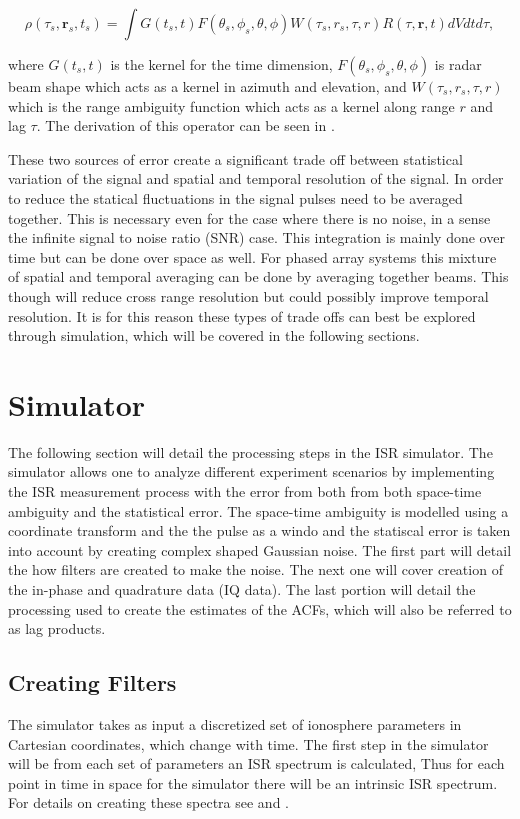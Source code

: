 \documentclass[draft,ras]{agutex}
\begin{document}
\begin{article}
\begin{equation}
\label{eqn:stafbrok}
\rho(\tau_s,\mathbf{r}_s,t_s)= \int G(t_s,t)F(\theta_s,\phi_s,\theta,\phi)W(\tau_s,r_s,\tau,r) R(\tau,\mathbf{r},t) dVdt d\tau,
\end{equation}

\noindent where $G(t_s,t)$ is the kernel for the time dimension, $F(\theta_s,\phi_s,\theta,\phi)$ is radar beam shape which acts as a kernel in azimuth and elevation, and $W(\tau_s,r_s,\tau,r) $ which is the range ambiguity function which acts as a kernel along range $r$ and lag $\tau$. The derivation of this operator can be seen in \citet{RDS:RDS20236}.

These two sources of error create a significant trade off between statistical variation of the signal and spatial and temporal resolution of the signal. In order to reduce the statical fluctuations in the signal pulses need to be averaged together. This is necessary even for the case where there is no noise, in a sense the infinite signal to noise ratio (SNR) case. This integration is mainly done over time but can be done over space as well. For phased array systems this mixture of spatial and temporal averaging can be done by averaging together beams. This though will reduce cross range resolution but could possibly improve temporal resolution. It is for this reason these types of trade offs can best be explored through simulation, which will be covered in the following sections.
\section{Simulator}

The following section will detail the processing steps in the ISR simulator. The simulator allows one to analyze different experiment scenarios by implementing the ISR measurement process with the error from both from both space-time ambiguity and the statistical error. The space-time ambiguity is modelled using a coordinate transform and the the pulse as a windo and the statiscal error is taken into account by creating complex shaped Gaussian noise. The first part will detail the how filters are created to make the noise. The next one will cover creation of the in-phase and quadrature data (IQ data). The last portion will detail the processing used to create the estimates of the ACFs, which will also be referred to as lag products.

\subsection{Creating Filters}
The simulator takes as input a discretized set of ionosphere parameters in Cartesian coordinates, which change with time. The first step in the simulator will be from each set of parameters an ISR spectrum is calculated, Thus for each point in time in space for the simulator there will be an intrinsic ISR spectrum. For details on creating these spectra see \citet{kudeki:milla:1} and \citet{kudeki:milla:2}. 


\end{article}
\end{document}
